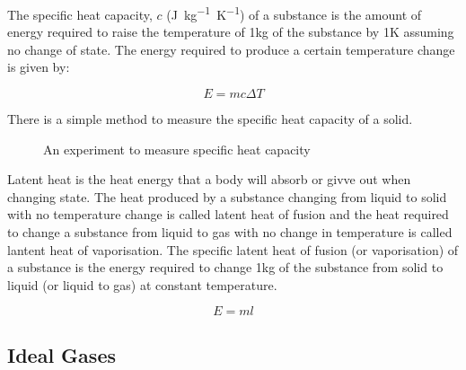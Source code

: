 \documentclass[a4,8pt]{article}
\begin{document}
The specific heat capacity, $c$ (\si{J kg^{-1} K^{-1}}) of a substance is the amount of energy required to raise the temperature of 1\si{\kilogram} of the substance by 1\si{\kelvin} assuming no change of state. The energy required to produce a certain temperature change is given by:

$$E = mc \Delta T$$ 

There is a simple method to measure the specific heat capacity of a solid. 

\begin{figure}[H]
\begin{tikzpicture}
\end{tikzpicture}
\caption{An experiment to measure specific heat capacity}
\end{figure}

Latent heat is the heat energy that a body will absorb or givve out when changing state. The heat produced by a substance changing from liquid to solid with no temperature change is called latent heat of fusion and the heat required to change a substance from liquid to gas with no change in temperature is called lantent heat of vaporisation. The specific latent heat of fusion (or vaporisation) of a substance is the energy required to change 1\si{\kilogram} of the substance from solid to liquid (or liquid to gas) at constant temperature.

$$E = ml$$

\subsection{Ideal Gases}
\end{document}

